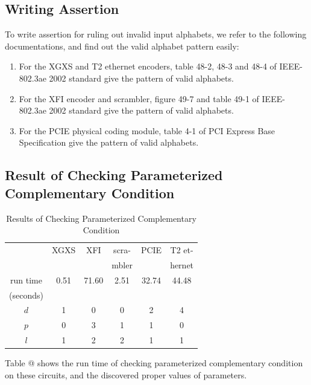 \documentclass[journal]{IEEEtran}
\makeatletter
\newcommand{\Rmnum}[1]{\expandafter\@slowromancap\romannumeral #1@}
\makeatother
\begin{document}
\subsection{Writing Assertion}
To write assertion for ruling out invalid input alphabets,
we refer to the following documentations,
and find out the valid alphabet pattern easily:
\begin{enumerate}
  \item For the XGXS and T2 ethernet encoders,
  table 48-2, 48-3 and 48-4 of IEEE-802.3ae 2002 standard \cite{IEEE80232002} give the pattern of valid alphabets.
  \item For the XFI encoder and scrambler,
  figure 49-7 and table 49-1 of IEEE-802.3ae 2002 standard \cite{IEEE80232002} give the pattern of valid alphabets.
  \item For the PCIE physical coding module,
  table 4-1 of PCI Express Base Specification \cite{PCIESPEC} give the pattern of valid alphabets.
\end{enumerate}



\subsection{Result of Checking Parameterized Complementary Condition}
\begin{table}[!t]
\centering
\caption{Results of Checking Parameterized Complementary Condition}
\begin{tabular}{|c|c|c|c|c|c|}
\hline
&XGXS&XFI&scra-&PCIE&T2 et-\\
&&&mbler&&hernet\\ \hline
run time&0.51&71.60&2.51&32.74&44.48\\
(seconds)&&&&&\\\hline
$d$      &1       &0     &0         &2   &4          \\ \hline
$p$      &0       &3     &1         &1   &0          \\ \hline
$l$      &1       &2     &2         &1   &1          \\ \hline
\end{tabular}
\end{table}

Table \Rmnum{2} shows the run time of checking parameterized complementary condition on these circuits,
and the discovered proper values of parameters.
\end{document}
